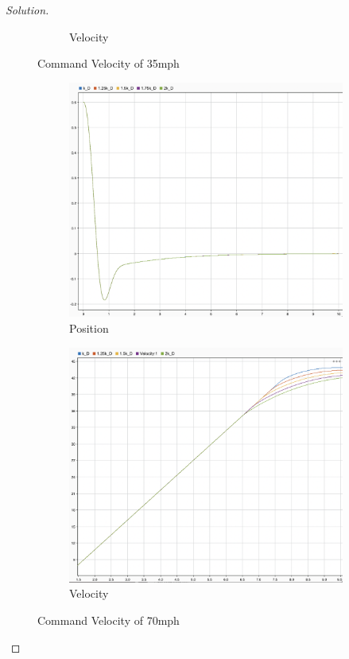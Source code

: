 \documentclass{article}
\begin{document}
\begin{proof}[Solution]
\begin{figure}[h!]
\begin{subfigure}{0.4\linewidth}
      \caption{Velocity}
    \end{subfigure}
    \caption{Command Velocity of 35mph}
\end{figure}

\begin{figure}[h!]
    \centering
    \begin{subfigure}{0.4\linewidth}
      \includegraphics[width=\linewidth]{img28.png}
      \caption{Position}
    \end{subfigure}
    \begin{subfigure}{0.4\linewidth}
      \includegraphics[width=\linewidth]{img29.png}
      \caption{Velocity}
    \end{subfigure}
    \caption{Command Velocity of 70mph}
\end{figure}


\end{proof}
\end{document}

